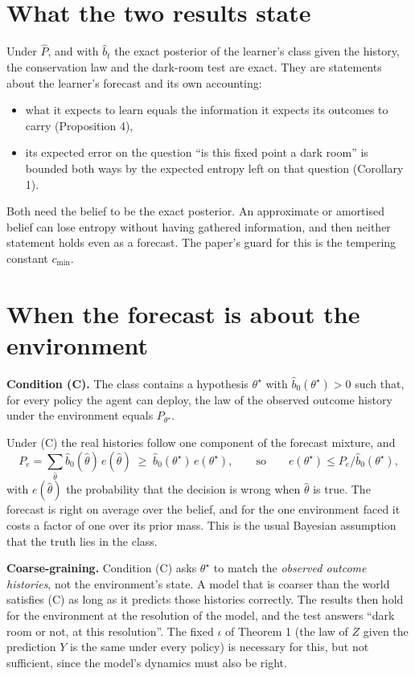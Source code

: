 \documentclass[10pt]{article}
\begin{document}
\section{What the two results state}
Under $\hat P$, and with $\hat b_t$ the exact posterior of the learner's class given the history, the conservation law and the dark-room test are exact.
They are statements about the learner's forecast and its own accounting:
\begin{itemize}
  \item what it expects to learn equals the information it expects its outcomes to carry (Proposition 4),
  \item its expected error on the question ``is this fixed point a dark room'' is bounded both ways by the expected entropy left on that question (Corollary 1).
\end{itemize}
Both need the belief to be the exact posterior.
An approximate or amortised belief can lose entropy without having gathered information, and then neither statement holds even as a forecast.
The paper's guard for this is the tempering constant $c_{\min}$.

\section{When the forecast is about the environment}
\textbf{Condition (C).}
The class contains a hypothesis $\theta^\star$ with $\hat b_0(\theta^\star) > 0$ such that, for every policy the agent can deploy, the law of the observed outcome history under the environment equals $P_{\theta^\star}$.

Under (C) the real histories follow one component of the forecast mixture, and
\begin{equation*}
  P_e = \sum_{\hat\theta} \hat b_0(\hat\theta)\, e(\hat\theta) \;\ge\; \hat b_0(\theta^\star)\, e(\theta^\star),
  \qquad\text{so}\qquad
  e(\theta^\star) \le P_e / \hat b_0(\theta^\star),
\end{equation*}
with $e(\hat\theta)$ the probability that the decision is wrong when $\hat\theta$ is true.
The forecast is right on average over the belief, and for the one environment faced it costs a factor of one over its prior mass.
This is the usual Bayesian assumption that the truth lies in the class.

\textbf{Coarse-graining.}
Condition (C) asks $\theta^\star$ to match the \emph{observed outcome histories}, not the environment's state.
A model that is coarser than the world satisfies (C) as long as it predicts those histories correctly.
The results then hold for the environment at the resolution of the model, and the test answers ``dark room or not, at this resolution''.
The fixed $\iota$ of Theorem 1 (the law of $Z$ given the prediction $Y$ is the same under every policy) is necessary for this, but not sufficient, since the model's dynamics must also be right.
\end{document}

